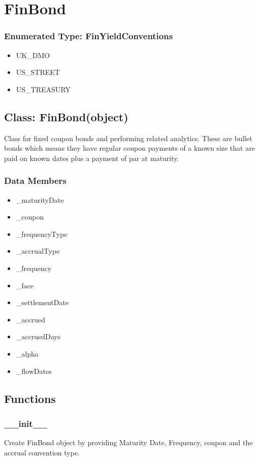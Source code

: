 \documentclass[twoside,11pt]{book}
\begin{document}
\section{FinBond}

\subsubsection{Enumerated Type: FinYieldConventions}
\begin{itemize}
\item{UK\_DMO}
\item{US\_STREET}
\item{US\_TREASURY}
\end{itemize}

\subsection*{Class: FinBond(object)}
Class for fixed coupon bonds and performing related analytics. These are bullet bonds which means they have regular coupon payments of a known size that are paid on known dates plus a payment of par at maturity. 

\subsubsection*{Data Members}
\begin{itemize}
\item{\_maturityDate}
\item{\_coupon}
\item{\_frequencyType}
\item{\_accrualType}
\item{\_frequency}
\item{\_face}
\item{\_settlementDate}
\item{\_accrued}
\item{\_accruedDays}
\item{\_alpha}
\item{\_flowDates}
\end{itemize}

\subsection*{Functions}

\subsubsection*{{\bf \_\_init\_\_}}
Create FinBond object by providing Maturity Date, Frequency, coupon and the accrual convention type.  
\end{document}
